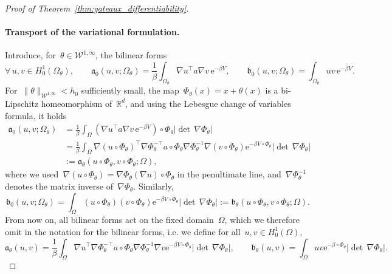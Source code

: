 \documentclass[a4]{article}
\newcommand{\e}{\mathrm{e}}
\newcommand{\R}{\mathbb{R}}
\newcommand{\fa}{\mathfrak{a}}
\newcommand{\fb}{\mathfrak{b}}
\newcommand{\1}{\mathbbm 1}
\newcommand{\Winf}{{{\cW}^{1,\infty}}}
\newcommand{\cW}{\mathcal{W}}
\begin{document}
\begin{proof}[Proof of Theorem~\ref{thm:gateaux_differentiability}]
    \paragraph{Transport of the variational formulation.}
    Introduce, for~$\theta\in\Winf$, the bilinear forms
    \begin{equation}
        \label{eq:bilinear_forms_0}
        \forall\,u,v\in H_0^1(\Omega_\theta),\qquad \fa_0(u,v;\Omega_\theta) = \frac1\beta\int_{\Omega_\theta}\nabla u^\top a \nabla v \,\e^{-\beta V},\qquad \fb_0(u,v;\Omega_\theta) = \int_{\Omega_\theta}uv\,\e^{-\beta V}.
    \end{equation}
    For~$\|\theta\|_{\Winf}<h_0$ sufficiently small, the map~$\Phi_\theta(x) = x + \theta(x)$ is a bi-Lipschitz homeomorphism of~$\R^d$, and using the Lebesgue change of variables formula, it holds
    \begin{equation}
        \begin{aligned}
        \fa_0(u,v;\Omega_\theta) &= \frac1\beta \int_{\Omega}\left(\nabla u^\top a \nabla v\,\e^{-\beta V}\right)\circ \Phi_\theta \left|\det\,\nabla \Phi_\theta\right|\\
        &=\frac1\beta\int_\Omega \nabla\left(u\circ \Phi_\theta\right)^\top \nabla \Phi_\theta^{-\top}a\circ \Phi_\theta \nabla \Phi_\theta^{-1}\nabla\left(v\circ\Phi_\theta\right)\e^{-\beta V\circ\Phi_\theta}\left|\det\,\nabla\Phi_\theta\right|\\
        &:=\fa_\theta(u\circ \Phi_\theta,v\circ\Phi_\theta;\Omega),
        \end{aligned}
    \end{equation}
    where we used~$\nabla\left(u\circ\Phi_\theta\right)=\nabla \Phi_\theta \left(\nabla u\right)\circ\Phi_\theta$ in the penultimate line, and~$\nabla \Phi_\theta^{-1}$ denotes the matrix inverse of~$\nabla \Phi_\theta$.
    Similarly,
    \begin{equation}
        \fb_0(u,v;\Omega_\theta) = \int_\Omega \left(u\circ\Phi_\theta\right) \left(v\circ\Phi_\theta\right) \e^{-\beta V\circ \Phi_\theta}\left|\det\,\nabla \Phi_\theta\right| := \fb_\theta(u\circ\Phi_\theta,v\circ\Phi_\theta;\Omega).
    \end{equation}
    From now on, all bilinear forms act on the fixed domain~$\Omega$, which we therefore omit in the notation for the bilinear forms, i.e. we define for all~$u,v\in H_0^1(\Omega)$,
    \begin{equation}
        \label{eq:bilinear_forms}
        \fa_\theta(u,v) = \frac1\beta\int_\Omega \nabla u^\top \nabla \Phi_\theta^{-\top}a\circ \Phi_\theta \nabla \Phi_\theta^{-1}\nabla v\e^{-\beta V\circ\Phi_\theta}\left|\det\,\nabla\Phi_\theta\right|,\qquad \fb_\theta(u,v) = \int_\Omega uv\e^{-\beta \circ \Phi_\theta}\left|\det\,\nabla\Phi_\theta\right|.
    \end{equation}


\end{proof}
\end{document}
